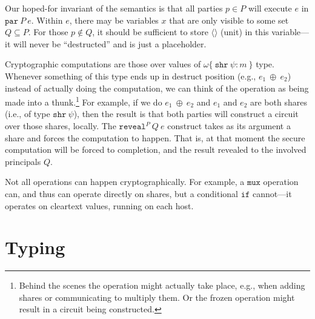 \documentclass[10pt]{article}
\newcommand{\kw}[1]{\ensuremath{\mathtt{#1}}}
\newcommand{\sshare}[1]{\ensuremath{\mathtt{shr}~{#1}}}
\newcommand{\sectyp}[3]{\ensuremath{{#1} \{~{#2}:{#3}~\}}}
\newcommand{\ebinop}[2]{\ensuremath{{#1}~\oplus~{#2}}}
\newcommand{\epar}[2]{\ensuremath{\kw{par}~{#1}~{#2}}}
\newcommand{\ereveal}[3]{\ensuremath{\kw{reveal}^{#1}~{#2}~{#3}}}
\begin{document}
Our hoped-for invariant of the semantics is that all parties $p \in P$
will execute $e$ in $\epar{P}{e}$. Within $e$, there may be variables
$x$ that are only visible to some set $Q \subseteq P$. For those
$p \not\in Q$, it should be sufficient to store $\langle \rangle$
(unit) in this variable---it will never be ``destructed'' and is just
a placeholder.

Cryptographic computations are those over values of
$\sectyp{\omega}{\sshare{\psi}}{m}$ type. Whenever something of this
type ends up in destruct position (e.g., $\ebinop{e_1}{e_2}$) instead
of actually doing the computation, we can think of the operation as
being made into a thunk.\footnote{Behind the scenes the operation
  might actually take place, e.g., when adding shares or communicating
  to multiply them. Or the frozen operation might result in a circuit
  being constructed.} For example, if we do $\ebinop{e_1}{e_2}$ and
$e_1$ and $e_2$ are both shares (i.e., of type $\sshare{\psi}$), then
the result is that both parties will construct a circuit over those
shares, locally. The $\ereveal{P}{Q}{e}$ construct takes as its argument
a share and forces the computation to happen. That is, at that moment
the secure computation will be forced to completion, and the result
revealed to the involved principals $Q$.

Not all operations can happen cryptographically. For example, a
$\kw{mux}$ operation can, and thus can operate directly on shares, but
a conditional $\kw{if}$ cannot---it operates on cleartext values,
running on each host.

\section{Typing}
\end{document}
